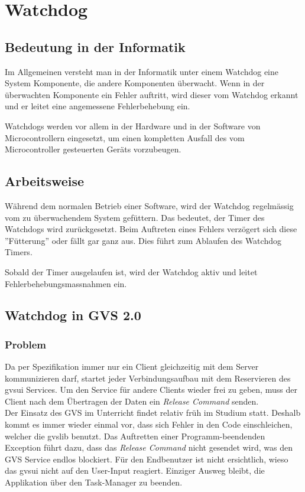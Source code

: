 \documentclass[11pt,a4paper,english,oneside]{book}
\numberwithin{equation}{chapter}
\begin{document}
	\section{Watchdog} \label{sec:watchdog}
	\subsection{Bedeutung in der Informatik}
	Im  Allgemeinen versteht man in der Informatik unter einem Watchdog eine System Komponente, die andere Komponenten überwacht. Wenn in der überwachten Komponente ein Fehler auftritt, wird dieser vom Watchdog erkannt und er leitet eine angemessene Fehlerbehebung ein.
	
	Watchdogs werden vor allem in der Hardware und in der Software von Microcontrollern eingesetzt, um einen kompletten Ausfall des vom Microcontroller gesteuerten Geräts vorzubeugen.
	
	\subsection{Arbeitsweise}
	Während dem normalen Betrieb einer Software, wird der Watchdog regelmässig vom zu überwachendem System gefüttern. Das bedeutet, der Timer des Watchdogs wird zurückgesetzt. Beim Auftreten eines Fehlers verzögert sich diese ''Fütterung'' oder fällt gar ganz aus. Dies führt zum Ablaufen des Watchdog Timers.
	
	Sobald der Timer ausgelaufen ist, wird der Watchdog aktiv und leitet Fehlerbehebungsmassnahmen ein.
	
	\subsection{Watchdog in GVS 2.0}
	\subsubsection{Problem}
	Da per Spezifikation immer nur ein Client gleichzeitig mit dem Server kommunizieren darf, startet jeder Verbindungsaufbau mit dem Reservieren des \gls{gvsui} Services. Um den Service für andere Clients wieder frei zu geben, muss der Client nach dem Übertragen der Daten ein \textit{Release Command} senden.\\
	
	\noindent
	Der Einsatz des GVS im Unterricht findet relativ früh im Studium statt. Deshalb kommt es immer wieder einmal vor, dass sich Fehler in den Code einschleichen, welcher die \gls{gvslib} benutzt. Das Auftretten einer Programm-beendenden Exception führt dazu, dass das \textit{Release Command} nicht gesendet wird, was den GVS Service endlos blockiert. Für den Endbenutzer ist nicht ersichtlich, wieso das \gls{gvsui} nicht auf den User-Input reagiert. Einziger Ausweg bleibt, die Applikation über den Task-Manager zu beenden.
	
\end{document}
